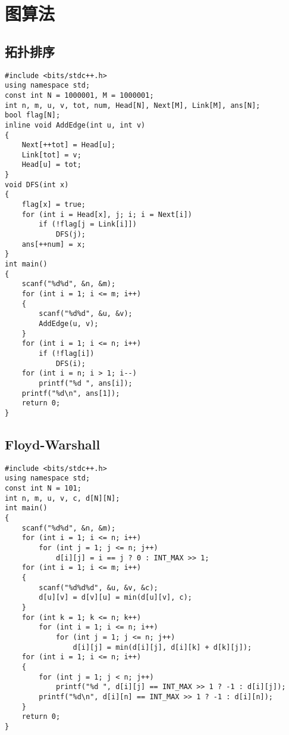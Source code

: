 \documentclass[a4paper]{article}
\begin{document}
\section{图算法}
\subsection{拓扑排序}
\begin{lstlisting}
#include <bits/stdc++.h>
using namespace std;
const int N = 1000001, M = 1000001;
int n, m, u, v, tot, num, Head[N], Next[M], Link[M], ans[N];
bool flag[N];
inline void AddEdge(int u, int v)
{
    Next[++tot] = Head[u];
    Link[tot] = v;
    Head[u] = tot;
}
void DFS(int x)
{
    flag[x] = true;
    for (int i = Head[x], j; i; i = Next[i])
        if (!flag[j = Link[i]])
            DFS(j);
    ans[++num] = x;
}
int main()
{
    scanf("%d%d", &n, &m);
    for (int i = 1; i <= m; i++)
    {
        scanf("%d%d", &u, &v);
        AddEdge(u, v);
    }
    for (int i = 1; i <= n; i++)
        if (!flag[i])
            DFS(i);
    for (int i = n; i > 1; i--)
        printf("%d ", ans[i]);
    printf("%d\n", ans[1]);
    return 0;
}
\end{lstlisting}
\subsection{Floyd-Warshall}
\begin{lstlisting}
#include <bits/stdc++.h>
using namespace std;
const int N = 101;
int n, m, u, v, c, d[N][N];
int main()
{
    scanf("%d%d", &n, &m);
    for (int i = 1; i <= n; i++)
        for (int j = 1; j <= n; j++)
            d[i][j] = i == j ? 0 : INT_MAX >> 1;
    for (int i = 1; i <= m; i++)
    {
        scanf("%d%d%d", &u, &v, &c);
        d[u][v] = d[v][u] = min(d[u][v], c);
    }
    for (int k = 1; k <= n; k++)
        for (int i = 1; i <= n; i++)
            for (int j = 1; j <= n; j++)
                d[i][j] = min(d[i][j], d[i][k] + d[k][j]);
    for (int i = 1; i <= n; i++)
    {
        for (int j = 1; j < n; j++)
            printf("%d ", d[i][j] == INT_MAX >> 1 ? -1 : d[i][j]);
        printf("%d\n", d[i][n] == INT_MAX >> 1 ? -1 : d[i][n]);
    }
    return 0;
}
\end{lstlisting}
\end{document}
